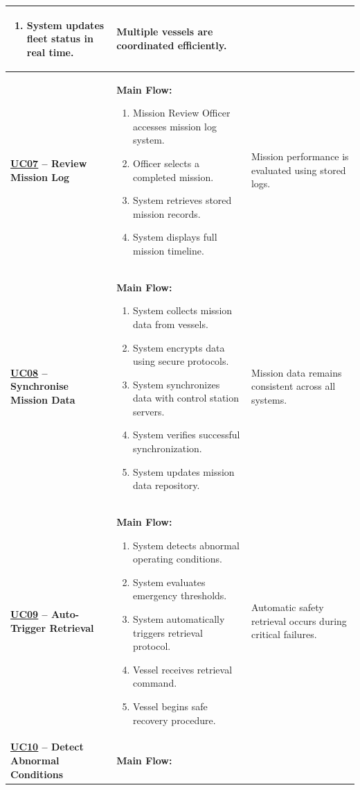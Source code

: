 \documentclass[11pt,a4paper]{article}
\let\orighyperref\hyperref
\renewcommand{\hyperref}[2][]{\orighyperref[#1]{\uline{#2}}}%
\begin{document}
\begin{longtable}{|>{\raggedright\arraybackslash}p{}|>{\raggedright\arraybackslash}p{}|>{\raggedright\arraybackslash}p{}|}
\begin{enumerate}[leftmargin=*,nosep]
  \item System updates fleet status in real time.
\end{enumerate} & Multiple vessels are coordinated efficiently. \\
\hline
\textbf{\hyperref[fig:usecase-diagram-pdf]{UC07} -- Review Mission Log} & \textbf{Main Flow:}\begin{enumerate}[leftmargin=*,nosep]
  \item Mission Review Officer accesses mission log system.
  \item Officer selects a completed mission.
  \item System retrieves stored mission records.
  \item System displays full mission timeline.
\end{enumerate} & Mission performance is evaluated using stored logs. \\
\hline
\textbf{\hyperref[fig:usecase-diagram-pdf]{UC08} -- Synchronise Mission Data} & \textbf{Main Flow:}\begin{enumerate}[leftmargin=*,nosep]
  \item System collects mission data from vessels.
  \item System encrypts data using secure protocols.
  \item System synchronizes data with control station servers.
  \item System verifies successful synchronization.
  \item System updates mission data repository.
\end{enumerate} & Mission data remains consistent across all systems. \\
\hline
\textbf{\hyperref[fig:usecase-diagram-pdf]{UC09} -- Auto-Trigger Retrieval} & \textbf{Main Flow:}\begin{enumerate}[leftmargin=*,nosep]
  \item System detects abnormal operating conditions.
  \item System evaluates emergency thresholds.
  \item System automatically triggers retrieval protocol.
  \item Vessel receives retrieval command.
  \item Vessel begins safe recovery procedure.
\end{enumerate} & Automatic safety retrieval occurs during critical failures. \\
\hline
\textbf{\hyperref[fig:usecase-diagram-pdf]{UC10} -- Detect Abnormal Conditions} & \textbf{Main Flow:}\begin{enumerate}[leftmargin=*,nosep]

\end{enumerate}
\end{longtable}
\end{document}
